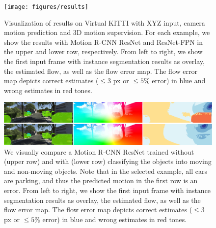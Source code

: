 \begin{figure}[t]
  \centering
  \texttt{[image: figures/results]}
\caption{
Visualization of results on Virtual KITTI with XYZ input, camera motion prediction and 3D motion supervision.
For each example, we show the results with Motion R-CNN ResNet and ResNet-FPN
in the upper and lower row, respectively.
From left to right, we show the first input frame with instance segmentation results as overlay,
the estimated flow, as well as the flow error map.
The flow error map depicts correct estimates ($\leq 3$ px or $\leq 5\%$ error) in blue and wrong estimates in red tones.
}
\label{figure:vkitti}
\end{figure}

\begin{figure}[t]
  \centering
  \includegraphics[width=\textwidth]{figures/moving}
\caption{
We visually compare a Motion R-CNN ResNet trained without (upper row) and
with (lower row) classifying the objects into moving and non-moving objects.
Note that in the selected example, all cars are parking, and thus the predicted
motion in the first row is an error.
From left to right, we show the first input frame with instance segmentation results as overlay,
the estimated flow, as well as the flow error map.
The flow error map depicts correct estimates ($\leq 3$ px or $\leq 5\%$ error) in blue and wrong estimates in red tones.
}
\label{figure:moving}
\end{figure}

